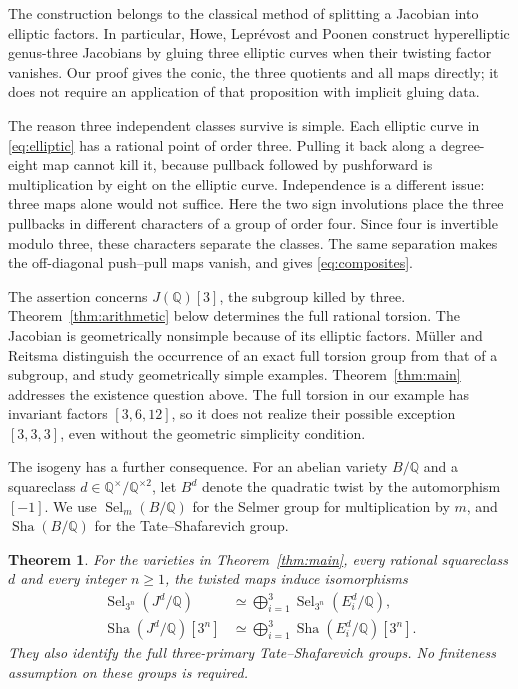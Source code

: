 \documentclass[11pt,reqno]{amsart}
\newtheorem{theorem}{Theorem}
\theoremstyle{remark}
\newcommand{\Q}{\mathbb Q}
\newcommand{\Sel}{\operatorname{Sel}}
\DeclareMathOperator{\Sha}{Sha}
\begin{document}
The construction belongs to the classical method of splitting a
Jacobian into elliptic factors. In particular,
Howe, Lepr\'evost and Poonen \cite[Proposition~14]{HLP} construct
hyperelliptic genus-three Jacobians by gluing three elliptic curves
when their twisting factor vanishes. Our proof gives the conic,
the three quotients and all maps directly; it does not require
an application of that proposition with implicit gluing data.

The reason three independent classes survive is simple. Each elliptic
curve in \eqref{eq:elliptic} has a rational point of order three.
Pulling it back along a degree-eight map cannot kill it, because
pullback followed by pushforward is multiplication by eight on the
elliptic curve. Independence is a different issue: three maps alone
would not suffice. Here the two sign involutions place the three
pullbacks in different characters of a group of order four. Since four
is invertible modulo three, these characters separate the classes.
The same separation makes the off-diagonal push--pull maps vanish,
and gives \eqref{eq:composites}.

The assertion concerns \(J(\Q)[3]\), the subgroup killed by three.
Theorem~\ref{thm:arithmetic} below determines the full rational torsion.
The Jacobian is geometrically nonsimple because of its elliptic factors.
M\"uller and Reitsma \cite[Theorem~1.1 and Remark~1.2]{MR} distinguish
the occurrence of an exact full torsion group from that of a subgroup,
and study geometrically simple examples. Theorem~\ref{thm:main}
addresses the existence question above. The full torsion in our example
has invariant factors \([3,6,12]\), so it does not realize their possible
exception \([3,3,3]\), even without the geometric simplicity condition.

The isogeny has a further consequence. For an abelian variety \(B/\Q\)
and a squareclass \(d\in\Q^\times/\Q^{\times2}\), let \(B^d\) denote
the quadratic twist by the automorphism \([-1]\). We use
\(\Sel_m(B/\Q)\) for the Selmer group for multiplication by \(m\),
and \(\Sha(B/\Q)\) for the Tate--Shafarevich group.

\begin{theorem}\label{thm:descent}
For the varieties in Theorem~\ref{thm:main}, every rational
squareclass \(d\) and every integer \(n\geq1\), the twisted maps induce
isomorphisms
\begin{align*}
 \Sel_{3^n}(J^d/\Q)&\simeq
       \bigoplus_{i=1}^3\Sel_{3^n}(E_i^d/\Q),\\
 \Sha(J^d/\Q)[3^n]&\simeq
       \bigoplus_{i=1}^3\Sha(E_i^d/\Q)[3^n].
\end{align*}
They also identify the full three-primary Tate--Shafarevich groups.
No finiteness assumption on these groups is required.
\end{theorem}
\end{document}
